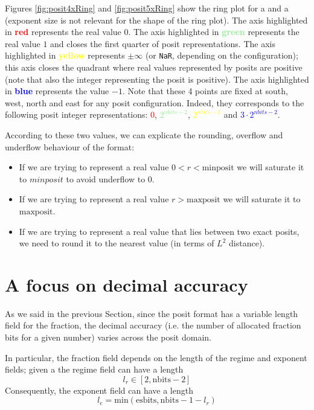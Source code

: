 Figures \ref{fig:posit4xRing} and \ref{fig:posit5xRing} show the ring plot for a  and a  (exponent size is not relevant for the shape of the ring plot). The axis highlighted in \textbf{\textcolor{red}{red}} represents the real value $0$. The axis highlighted in \textbf{\textcolor{lightgreen}{green}} represents the real value $1$ and closes the first quarter of posit representations. The axis highlighted in \textbf{\textcolor{yellow}{yellow}} represents $\pm \infty$ (or \texttt{NaR}, depending on the configuration); this axis closes the quadrant where real values represented by posits are positive (note that also the integer representing the posit is positive). The axis highlighted in \textbf{\textcolor{blue}{blue}} represents the value $-1$. Note that these 4 points are fixed at south, west, north and east for any posit configuration. Indeed, they corresponds to the following posit integer representations: \textcolor{red}{0}, \textcolor{lightgreen}{$2^{nbits-2}$}, \textcolor{yellow}{$2^{nbits - 1}$} and \textcolor{blue}{$3 \cdot 2^{nbits-2}$}.

According to these two values, we can explicate the rounding, overflow and underflow behaviour of the format:
\begin{itemize}
    \item If we are trying to represent a real value $0 < r < \text{minposit}$ we will saturate it to $minposit$ to avoid underflow to $0$.
    \item If we are trying to represent a real value $r > \text{maxposit} $ we will saturate it to $\text{maxposit}$.
    \item If we are trying to represent a real value that lies between two exact posits, we need to round it to the nearest value (in terms of $L^2$ distance).
\end{itemize}




\section{A focus on decimal accuracy}

As we said in the previous Section, since the posit format has a variable length field for the fraction, the decimal accuracy (i.e. the number of allocated fraction bits for a given number) varies across the posit domain.

In particular, the fraction field depends on the length of the regime and exponent fields; given a  the regime field can have a length 
\[
l_r \in [2,\text{nbits}-2]
\]
Consequently, the exponent field can have a length 
\[
l_e = \text{min}(\text{esbits},\text{nbits}-1-l_r)
\]

